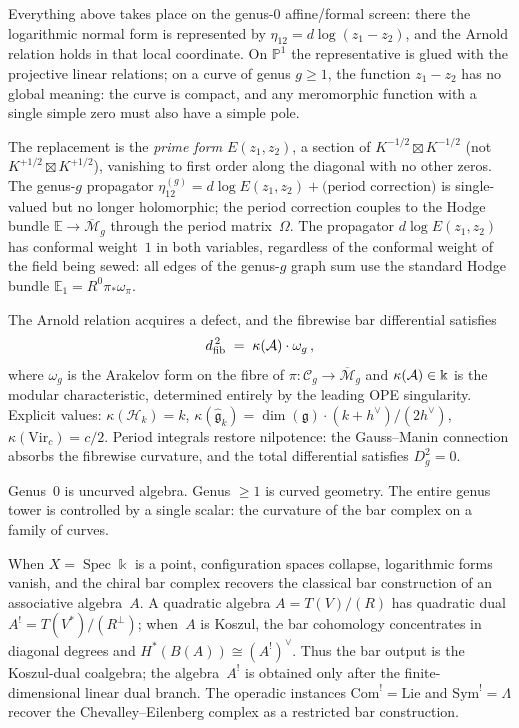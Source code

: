 Everything above takes place on the genus-$0$ affine/formal screen:
there the logarithmic normal form is represented by
\(\eta_{12}=d\log(z_1-z_2)\), and the Arnold relation holds in that
local coordinate. On \(\mathbb P^1\) the representative is glued with
the projective linear relations; on a curve of genus \(g \geq 1\), the
function \(z_1-z_2\) has no global meaning: the curve is compact, and
any meromorphic function with a single simple zero must also have a
simple pole.

The replacement is the \emph{prime form} $E(z_1,z_2)$, a section of
$K^{-1/2}\boxtimes K^{-1/2}$ (not $K^{+1/2}\boxtimes K^{+1/2}$),
vanishing to first order along the diagonal with no other zeros.
The genus-$g$ propagator
$\eta^{(g)}_{12} = d\log E(z_1,z_2) + \text{(period correction)}$
is single-valued but no longer holomorphic; the period correction
couples to the Hodge bundle
$\mathbb E \to \overline{\mathcal M}_g$ through the period
matrix~$\Omega$. The propagator $d\log E(z_1,z_2)$ has conformal
weight~$1$ in both variables, regardless of the conformal weight of
the field being sewed: all edges of the genus-$g$ graph sum use the
standard Hodge bundle $\mathbb E_1 = R^0\pi_*\omega_\pi$.

The Arnold relation acquires a defect, and the fibrewise bar
differential satisfies
\begin{equation}\label{eq:pf1-curvature}
d_{\mathrm{fib}}^{\,2}
\;=\;
\kappa(\mathcal{A})\cdot\omega_g\,,
\end{equation}
where $\omega_g$ is the Arakelov form on the fibre of
$\pi\colon\mathcal C_g \to \overline{\mathcal M}_g$ and
$\kappa(\mathcal{A})\in\Bbbk$ is the modular characteristic,
determined entirely by the leading OPE singularity. Explicit
values: $\kappa(\mathcal H_k) = k$,\;
$\kappa(\widehat{\mathfrak g}_k)
= \dim(\mathfrak g)\cdot(k+h^\vee)/(2h^\vee)$,\;
$\kappa(\mathrm{Vir}_c) = c/2$.
Period integrals restore nilpotence: the Gauss--Manin connection
absorbs the fibrewise curvature, and the total differential
satisfies $D_g^2 = 0$.

Genus~$0$ is uncurved algebra. Genus $\geq 1$ is curved
geometry. The entire genus tower is controlled by a single
scalar: the curvature of the bar complex on a family of curves.

\begin{remark}\label{rem:pf1-zero-dim}
When $X=\operatorname{Spec}\Bbbk$ is a point, configuration spaces
collapse, logarithmic forms vanish, and the chiral bar complex
recovers the classical bar construction of an associative
algebra~$A$. A quadratic algebra $A = T(V)/(R)$ has quadratic dual
$A^! = T(V^*)/(R^\perp)$; when~$A$ is Koszul, the bar cohomology
concentrates in diagonal degrees and
$H^*(B(A)) \cong (A^!)^\vee$. Thus the bar output is the
Koszul-dual coalgebra; the algebra~$A^!$ is obtained only after the
finite-dimensional linear dual branch. The operadic instances
$\mathrm{Com}^! = \mathrm{Lie}$ and
$\mathrm{Sym}^! = \Lambda$ recover the Chevalley--Eilenberg
complex as a restricted bar construction.
\end{remark}

